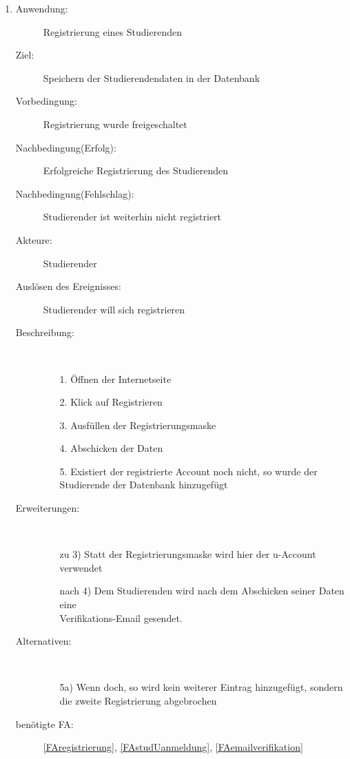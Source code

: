 \documentclass[parskip=full]{scrartcl}
\newcommand{\swtLabel}[1]{\textbf{/#1\arabic*0/}}
\begin{document}
\begin{enumerate}[label=\swtLabel{S}]
	\item \label{UCstudReg}
    \begin{description}
  	\item[Anwendung:] Registrierung eines Studierenden
  	\item[Ziel:] Speichern der Studierendendaten in der Datenbank
  	\item[Vorbedingung:] Registrierung wurde freigeschaltet
  	\item[Nachbedingung(Erfolg):] Erfolgreiche Registrierung des Studierenden
  	\item[Nachbedingung(Fehlschlag):] Studierender ist weiterhin nicht
  	registriert
  	\item[Akteure:] Studierender
  	\item[Auslösen des Ereignisses:] Studierender will sich registrieren
  	\item[Beschreibung:]~
  	\begin{enumerate}
  	  \item[1.] Öffnen der Internetseite
      \item[2.] Klick auf Registrieren
      \item[3.] Ausfüllen der Registrierungsmaske %
      \item[4.] Abschicken der Daten
      \item[5.] Existiert der registrierte Account noch nicht, so wurde der
      Studierende der Datenbank hinzugefügt
  	\end{enumerate}
  	\item[Erweiterungen:]~
  	\begin{enumerate}
  	  \item[zu 3)] Statt der Registrierungsmaske wird hier der u-Account
  	  verwendet
  	  \item[nach 4)] Dem Studierenden wird nach dem Abschicken seiner Daten eine
  	  \\
  	  Verifikations-Email gesendet.
  	 \end{enumerate} 
  	\item[Alternativen:]~
  	\begin{enumerate}
  	  \item[5a)] Wenn doch, so wird kein weiterer Eintrag hinzugefügt, sondern
  	  die zweite Registrierung abgebrochen
  	\end{enumerate} 
  	\item[benötigte FA:] \ref{FAregistrierung}, \ref{FAstudUanmeldung},
  	\ref{FAemailverifikation}
  \end{description}
%   
  

\end{enumerate}
\end{document}
